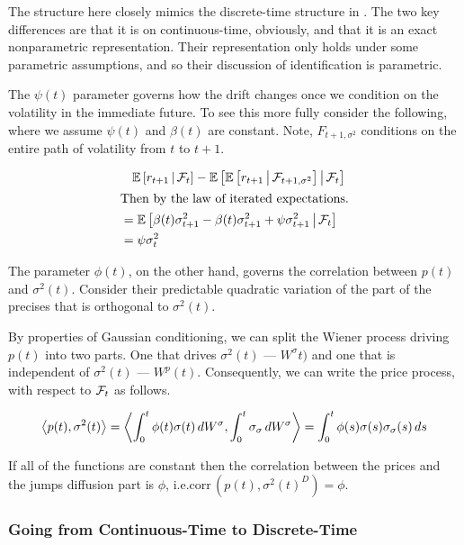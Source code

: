 \documentclass[11pt, letterpaper, twoside, final]{article}
\begin{document}
The structure here closely mimics the discrete-time structure in \textcite{khrapov2016affine}.
The two key differences are that it is on continuous-time, obviously, and that it is an exact nonparametric
representation.
Their representation only holds under some parametric assumptions, and so their discussion of identification is
parametric.


The $\psi(t)$ parameter governs how the drift changes once we condition on the volatility in the immediate
future.
To see this more fully consider the following, where we assume $\psi(t)$ and $\beta(t)$ are constant.
Note, $F_{t+1, \sigma^2}$ conditions on the entire path of volatility from $t$ to $t+1$.


\begin{align}
    &\phantom{=} \E\left[r_{t+1} \mvert \F_{t}\right]  - \E\left[\E\left[r_{t+1} \mvert \F_{t+1, \sigma^2} \right]
      \mvert \F_t \right]  \\
      \intertext{Then by the law of iterated expectations.}
    &=  \E\left[\beta(t) \sigma^2_{t+1} - \beta(t) \sigma^2_{t+1} + \psi \sigma^2_{t+1}  \mvert \F_t \right] \\
    &= \psi \sigma^2_t
\end{align}

The parameter $\phi(t)$, on the other hand, governs the correlation between $p(t)$ and $\sigma^2(t)$.
Consider their predictable quadratic variation of the part of the precises that is orthogonal to $\sigma^2(t)$.

By properties of Gaussian conditioning, we can split the Wiener process driving $p(t)$ into two parts.
One that drives $\sigma^2(t)$ --- $W^{\sigma}t)$ and one that is independent of $\sigma^2(t)$ --- $W^p(t)$.
Consequently, we can write the price process, with respect to $\F_t$ as follows.

\begin{equation}
    \predQV*{p(t), \sigma^2(t)}  
    = \predQV*{\int^t_0 \phi(t) \sigma(t) \dif W^{\sigma}, \int^t_0 \sigma_{\sigma} \dif W^{\sigma}} 
    = \int^t_0 \phi(s) \sigma(s) \sigma_{\sigma}(s) \dif s
\end{equation}

If all of the functions are  constant then the correlation between the prices and the jumps diffusion part is
$\phi$, i.e.\@  $\mathrm{corr}\,(p(t), {\sigma^2(t)}^D) = \phi$.

\subsubsection{Going from Continuous-Time to Discrete-Time}
\end{document}
